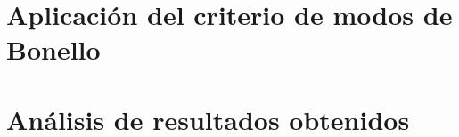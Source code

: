 \section{Aplicación del criterio de modos de Bonello}
\resetallcounters

\clearpage





\section{Análisis de resultados obtenidos}
\resetallcounters

\clearpage

